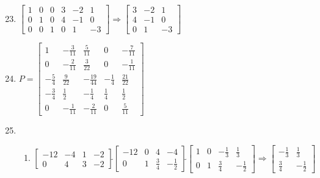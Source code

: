 \documentclass[12pt]{article}
\begin{document}
\begin{enumerate}
    \setcounter{enumi}{22}

  \item $\begin{bmatrix} 1 & 0 & 0 & 3 & -2 & 1\\ 0 & 1 & 0 & 4 & -1 & 0\\ 0 & 0 & 1 & 0 & 1 & -3  \end{bmatrix}\Rightarrow\begin{bmatrix} 3 & -2 & 1\\ 4 & -1 & 0\\ 0 & 1 & -3\end{bmatrix}$

    \setcounter{enumi}{34}

  \item $P=\begin{bmatrix} 1 & -\frac{3}{11} & \frac{5}{11} & 0 & -\frac{7}{11}\\0 & -\frac{2}{11} & \frac{3}{22} & 0 & -\frac{1}{11}\\ -\frac{5}{4} & \frac{9}{22} & -\frac{19}{44} & -\frac{1}{4} & \frac{21}{22}\\ -\frac{3}{4} & \frac{1}{2} & -\frac{1}{4} & \frac{1}{4} & \frac{1}{2}\\ 0 & -\frac{1}{11} & -\frac{2}{11} & 0 & \frac{5}{11}  \end{bmatrix}$

    \setcounter{enumi}{36}

  \item

    \begin{enumerate}

      \item $\begin{bmatrix} -12 & -4 & 1 & -2\\ 0 & 4 & 3 & -2  \end{bmatrix}\widetilde{ }\begin{bmatrix} -12 & 0 & 4 & -4\\ 0 & 1 & \frac{3}{4} & -\frac{1}{2}  \end{bmatrix}\widetilde{ }\begin{bmatrix} 1 & 0 & -\frac{1}{3} & \frac{1}{3}\\ 0 & 1 & \frac{3}{4} & -\frac{1}{2}  \end{bmatrix}\Rightarrow\begin{bmatrix} -\frac{1}{3} & \frac{1}{3}\\ \frac{3}{4} & -\frac{1}{2}\end{bmatrix}$


\end{enumerate}
\end{enumerate}
\end{document}
